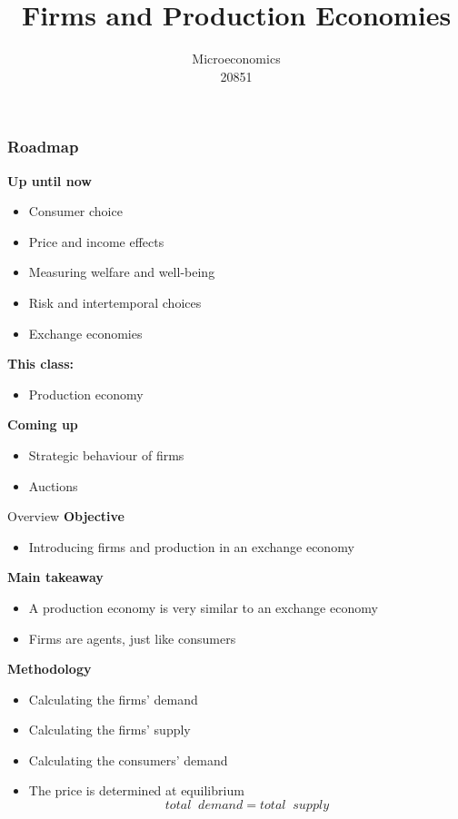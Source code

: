 \documentclass[handout]{beamer}
\title{Firms and Production Economies}
\author{Microeconomics \\ 20851}
\date{}
\newenvironment{iPar}[1]{\textbf{#1} \begin{itemize}}{\end{itemize}}
\newcommand{\mdp}{\medskip \pause}
\begin{document}
\frame{\titlepage}

\section[Outline]{}
\frame{\tableofcontents}

\section{}


\begin{frame}\frametitle{Roadmap}

\begin{iPar}{Up until now}
\item Consumer choice
\item Price and income effects
\item Measuring welfare and well-being 
\item Risk and intertemporal choices
\item Exchange economies
\end{iPar}\mdp

\begin{iPar}{This class:}
\item Production economy
\end{iPar}\mdp

\begin{iPar}{Coming up}
\item  Strategic behaviour of firms
\item Auctions
\end{iPar}


\end{frame}

\begin{frame}{Overview} \textbf{Objective} \begin{itemize} \item Introducing firms and production in an exchange economy  \end{itemize} \mdp
\textbf{Main takeaway} \begin{itemize} \item A production economy is very similar to an exchange economy \item Firms are agents, just like consumers \end{itemize} \mdp
\textbf{Methodology}\begin{itemize} \item Calculating the firms' demand \item Calculating the firms' supply \item Calculating the consumers' demand \item The price is determined at equilibrium $$total \;\; demand  = total \;\; supply $$\end{itemize}


\end{frame}
\end{document}

